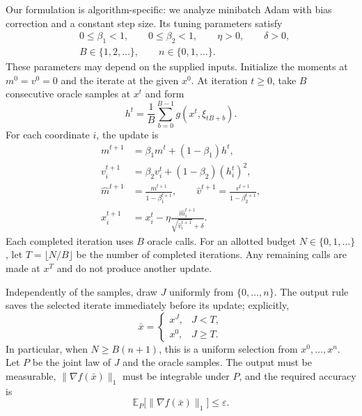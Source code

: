 \documentclass[10pt]{article}
\theoremstyle{definition}
\begin{document}
Our formulation is algorithm-specific: we analyze minibatch Adam with bias correction and a constant step size. Its tuning parameters satisfy
\[
\begin{aligned}
&0\leq\beta_1<1,\qquad 0\leq\beta_2<1,\qquad \eta>0,\qquad\delta>0,\\
&B\in\{1,2,\ldots\},\qquad n\in\{0,1,\ldots\}.
\end{aligned}
\]
These parameters may depend on the supplied inputs. Initialize the moments at $m^0=v^0=0$ and the iterate at the given $x^0$. At iteration $t\geq0$, take $B$ consecutive oracle samples at $x^t$ and form
\[
h^t=\frac{1}{B}\sum_{b=0}^{B-1}g(x^t,\xi_{tB+b}).
\]
For each coordinate $i$, the update is
\[
\begin{aligned}
m^{t+1}&=\beta_1m^t+(1-\beta_1)h^t,\\
v_i^{t+1}&=\beta_2v_i^t+(1-\beta_2)(h_i^t)^2,\\
\widehat m^{t+1}&=\frac{m^{t+1}}{1-\beta_1^{t+1}},\qquad
\widehat v^{t+1}=\frac{v^{t+1}}{1-\beta_2^{t+1}},\\
x_i^{t+1}&=x_i^t-\eta\frac{\widehat m_i^{t+1}}
 {\sqrt{\widehat v_i^{t+1}}+\delta}.
\end{aligned}
\]
Each completed iteration uses $B$ oracle calls. For an allotted budget $N\in\{0,1,\ldots\}$, let $T=\lfloor N/B\rfloor$ be the number of completed iterations. Any remaining calls are made at $x^T$ and do not produce another update.

Independently of the samples, draw $J$ uniformly from $\{0,\ldots,n\}$. The output rule saves the selected iterate immediately before its update; explicitly,
\[
\bar{x}=\begin{cases}
x^J,&J<T,\\
x^0,&J\geq T.
\end{cases}
\]
In particular, when $N\geq B(n+1)$, this is a uniform selection from $x^0,\ldots,x^n$. Let $P$ be the joint law of $J$ and the oracle samples. The output must be measurable, $\|\nabla f(\bar{x})\|_1$ must be integrable under $P$, and the required accuracy is
\[
\mathbb{E}_{P}\bigl[\|\nabla f(\bar{x})\|_1\bigr]\leq\varepsilon.
\]
\end{document}
